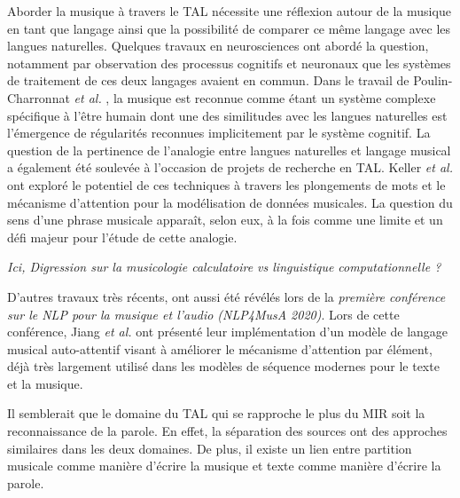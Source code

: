 Aborder la musique à travers le TAL nécessite une réflexion autour de la musique en tant que langage ainsi que la possibilité de comparer ce même langage avec les langues naturelles. Quelques travaux en neurosciences ont abordé la question, notamment par observation des processus cognitifs et neuronaux que les systèmes de traitement de ces deux langages avaient en commun. Dans le travail de Poulin-Charronnat \textit{et al.} \cite{poulincharronnat:hal-01985213}, la musique est reconnue comme étant un système complexe spécifique à l’être humain dont une des similitudes avec les langues naturelles est l’émergence de régularités reconnues implicitement par le système cognitif. La question de la pertinence de l’analogie entre langues naturelles et langage musical a également été soulevée à l’occasion de projets de recherche en TAL. Keller \textit{et al.} \cite{keller:hal-03279850} ont exploré le potentiel de ces techniques à travers les plongements de mots et le mécanisme d’attention pour la modélisation de données musicales. La question du sens d’une phrase musicale apparaît, selon eux, à la fois comme une limite et un défi majeur pour l’étude de cette analogie.

\textit{Ici, Digression sur la musicologie calculatoire vs linguistique computationnelle ?}

D’autres travaux très récents, ont aussi été révélés lors de la \textit{première conférence sur le NLP pour la musique et l'audio (NLP4MusA 2020)}. 
Lors de cette conférence, Jiang \textit{et al.} \cite{Jiang2020DiscoveringMR} ont présenté leur implémentation d’un modèle de langage musical auto-attentif visant à améliorer le mécanisme d'attention par élément, 
déjà très largement utilisé dans les modèles de séquence modernes pour le texte et la musique.

Il semblerait que le domaine du TAL 
qui se rapproche le plus du MIR soit la reconnaissance de la parole. 
%
En effet, la séparation des sources ont des approches similaires dans les deux domaines. 
De plus, il existe un lien entre partition musicale comme manière d’écrire la musique et texte comme manière d’écrire la parole.



